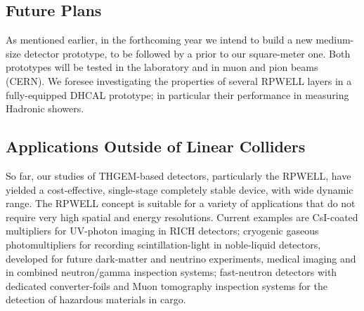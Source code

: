 \subsection{Future Plans}
As mentioned earlier, in the forthcoming year we intend to build a new medium-size detector prototype, to be followed by a prior to our square-meter one. Both prototypes will be tested in the laboratory and in muon and pion beams (CERN).
We foresee investigating the properties of several RPWELL layers in a fully-equipped DHCAL prototype; in particular their performance in measuring Hadronic showers.

\subsection{Applications Outside of Linear Colliders}
So far, our studies of THGEM-based detectors, particularly the RPWELL, have yielded a cost-effective, single-stage completely stable device, with wide dynamic range. The RPWELL concept is suitable for a variety of applications that do not require very high spatial and energy resolutions. Current examples are CsI-coated multipliers for UV-photon imaging in RICH detectors; cryogenic gaseous photomultipliers for recording scintillation-light in noble-liquid detectors, developed for future dark-matter and neutrino experiments, medical imaging and in combined neutron/gamma inspection systems; fast-neutron detectors with dedicated converter-foils and Muon tomography inspection systems for the detection of hazardous materials in cargo.
